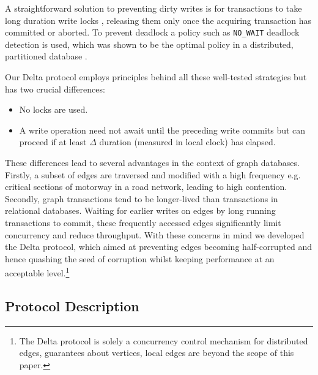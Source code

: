 \documentclass[sigplan,10pt]{acmart}
\newcommand{\tDelta}{\textsf{Delta}\xspace}
\begin{document}
A straightforward solution to preventing dirty writes is for transactions to take long duration write locks \cite{Berenson1995}, releasing them only once the acquiring transaction has committed or aborted. To prevent deadlock a policy such as \texttt{NO_WAIT} deadlock detection is used, which was shown to be the optimal policy in a distributed, partitioned database \cite{Harding2017}.

Our \tDelta protocol employs principles behind all these well-tested strategies but has two crucial differences:
\begin{itemize}
\item No locks are used.
\item A write operation need not await until the preceding write commits but can proceed if at least $\Delta$ duration (measured in local clock) has elapsed.
\end{itemize}

These differences lead to several advantages in the context of graph databases. Firstly, a subset of edges are traversed and modified with a high frequency e.g. critical sections of motorway in a road network, leading to high contention. Secondly, graph transactions tend to be longer-lived than transactions in relational databases. Waiting for earlier writes on edges by long running transactions to commit, these frequently accessed edges significantly limit concurrency and reduce throughput. With these concerns in mind we developed the \tDelta protocol, which aimed at preventing edges becoming half-corrupted and hence quashing the seed of corruption whilst keeping performance at an acceptable level.\footnote{The \tDelta protocol is solely a concurrency control mechanism for distributed edges, guarantees about vertices, local edges are beyond the scope of this paper.}

\subsection{Protocol Description}
\label{sec:protocol-description}
\end{document}
